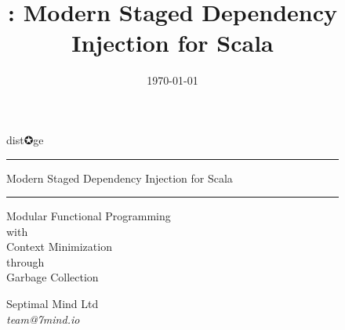 \documentclass[usenames,dvipsnames]{beamer}
\title[\distage]{\distage: Modern Staged Dependency Injection for Scala}
\institute[Septimal Mind Ltd]
    {
    Septimal Mind Ltd\\
    \medskip
    \textit{team@7mind.io}
    }
\date{\today}
\begin{document}

\begin{frame}
\begin{figure}
\Huge 
\color{RubineRed} dist✪ge
\noindent
\rule{\linewidth}{1mm}
\Large Modern Staged Dependency Injection for Scala
\rule{\linewidth}{1mm}
\end{figure}

\begin{figure}
\color{RubineRed}
\normalsize Modular Functional Programming \\
with \\
Context Minimization \\
through \\
Garbage Collection
\end{figure}

\begin{figure}
\Large Septimal Mind Ltd \\
\medskip
\textit{team@7mind.io}
\end{figure}

\end{frame}

\end{document}
